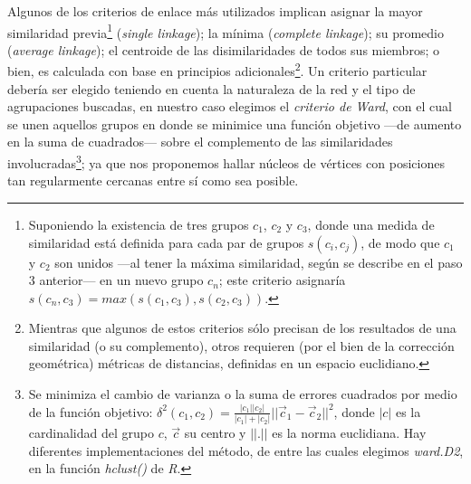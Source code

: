\documentclass[letterpaper, 11pt]{book}
\theoremstyle{definition}
\theoremstyle{remark}
\begin{document}
Algunos de los criterios de enlace más utilizados implican asignar la mayor similaridad previa\footnote{
    Suponiendo la existencia de tres grupos $c_1$, $c_2$ y $c_3$, donde una medida de similaridad está definida para cada par de grupos $s(c_i,c_j)$, de modo que $c_1$ y $c_2$ son unidos ---al tener la máxima similaridad, según se describe en el paso 3 anterior--- en un nuevo grupo $c_n$; este criterio asignaría $s(c_n,c_3) = max( s(c_1,c_3), s(c_2,c_3) )$. 
} (\emph{single linkage}); la mínima (\emph{complete linkage});  su promedio (\emph{average linkage}); el centroide de las disimilaridades de todos sus miembros; o bien, es calculada con base en principios adicionales\footnote{
    Mientras que algunos de estos criterios sólo precisan de los resultados de una similaridad (o su complemento), otros requieren (por el bien de la corrección geométrica) métricas de distancias, definidas en un espacio euclidiano. 
}. 
Un criterio particular debería ser elegido teniendo en cuenta la naturaleza de la red y el tipo de agrupaciones buscadas, en nuestro caso elegimos el \emph{criterio de Ward}, con el cual se unen aquellos grupos en donde se minimice una función objetivo ---de aumento en la suma de cuadrados--- sobre el complemento de las similaridades involucradas\footnote{
    Se minimiza el cambio de varianza o la suma de errores cuadrados por medio de la función objetivo: 
    $\delta^{2}(c_1,c_2) = \frac{|c_1| |c_2|}{|c_1|+|c_2|}||\overrightarrow{c}_{1}-\overrightarrow{c}_{2}||^{2}$, donde $|c|$ es la cardinalidad del grupo $c$, $\overrightarrow{c}$ su centro y $||.||$ es la norma euclidiana. 
    Hay diferentes implementaciones del método, de entre las cuales elegimos \emph{ward.D2}, en la función \emph{hclust()} de \emph{R}. 
}; ya que nos proponemos hallar núcleos de vértices con posiciones tan regularmente cercanas entre sí como sea posible. 
\end{document}
